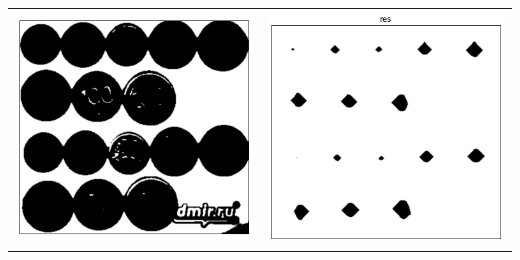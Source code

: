 \documentclass[12pt, a4paper]{article}
\begin{document}
\begin{center}
\begin{tabular}{c c}
			\includegraphics[width=8cm]{Money_3_bin.png} & \includegraphics[width=8cm]{Money_3_res.png} \\
		\end{tabular}


\end{center}
\end{document}

